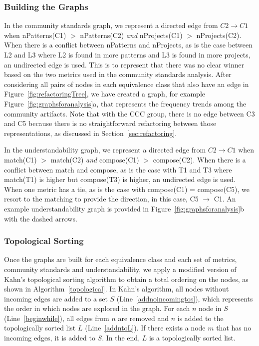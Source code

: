 \subsubsection{Building the Graphs}
In the community standards graph, we represent a directed edge from $C2 \rightarrow C1$ when  nPatterns(C1) $>$ nPatterns(C2) \emph{and}  nProjects(C1) $>$ nProjects(C2).
When there is a conflict between nPatterns and nProjects, as is the case between L2 and L3 where L2 is found in more patterns and L3 is found in more projects, an undirected edge is used.
This is to represent that there was no clear winner based on the two metrics used in the community standards analysis.
After considering all pairs of nodes in each equivalence class that also have an edge in Figure~\ref{fig:refactoringTree}, we have created a graph, for example Figure~\ref{fig:graphsforanalysis}a, that represents the frequency trends among the community artifacts. Note that with the CCC group, there is no edge between C3 and C5 because there is no straightforward refactoring between those representations, as discussed in Section~\ref{sec:refactoring}.

In the understandability graph, we represent a directed edge from $C2 \rightarrow C1$ when match(C1) $>$ match(C2) \emph{and} compose(C1) $>$ compose(C2). When there is a conflict between match and compose, as is the case with T1 and T3 where match(T1) is higher but compose(T3) is higher, an undirected edge is used. When one metric has a tie, as is the case with compose(C1) = compose(C5), we resort to the matching to provide the direction, in this case, C5 $\rightarrow$ C1. An example understandability graph is provided in Figure~\ref{fig:graphsforanalysis}b with the dashed arrows.

\subsubsection{Topological Sorting}
Once the graphs are built for each equivalence class and each set of metrics, community standards and understandability, we apply a modified version of Kahn's topological sorting algorithm to obtain a total ordering on the nodes, as shown in Algorithm~\ref{topological}. In Kahn's algorithm, all nodes without incoming edges are added to a set $S$ (Line~\ref{addnoincomingtos}), which represents the order in which nodes are explored in the graph. For each $n$ node in $S$ (Line~\ref{beginwhile}), all edges from $n$ are removed and $n$ is added to the topologically sorted list $L$ (Line~\ref{addntoL}). If there exists a node $m$ that has no incoming edges, it is added to $S$.  In the end, $L$ is a topologically sorted list.

